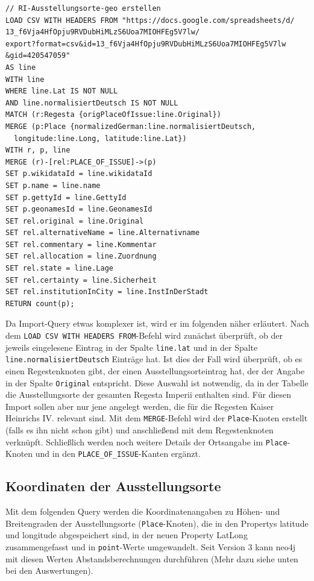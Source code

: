 \documentclass[ngerman,]{scrreprt}
\begin{document}
\begin{verbatim}
// RI-Ausstellungsorte-geo erstellen
LOAD CSV WITH HEADERS FROM "https://docs.google.com/spreadsheets/d/
13_f6Vja4HfOpju9RVDubHiMLzS6Uoa7MIOHFEg5V7lw/
export?format=csv&id=13_f6Vja4HfOpju9RVDubHiMLzS6Uoa7MIOHFEg5V7lw
&gid=420547059"
AS line
WITH line
WHERE line.Lat IS NOT NULL
AND line.normalisiertDeutsch IS NOT NULL
MATCH (r:Regesta {origPlaceOfIssue:line.Original})
MERGE (p:Place {normalizedGerman:line.normalisiertDeutsch,
  longitude:line.Long, latitude:line.Lat})
WITH r, p, line
MERGE (r)-[rel:PLACE_OF_ISSUE]->(p)
SET p.wikidataId = line.wikidataId
SET p.name = line.name
SET p.gettyId = line.GettyId
SET p.geonamesId = line.GeonamesId
SET rel.original = line.Original
SET rel.alternativeName = line.Alternativname
SET rel.commentary = line.Kommentar
SET rel.allocation = line.Zuordnung
SET rel.state = line.Lage
SET rel.certainty = line.Sicherheit
SET rel.institutionInCity = line.InstInDerStadt
RETURN count(p);
\end{verbatim}

Da Import-Query etwas komplexer ist, wird er im folgenden näher erläutert. Nach dem \texttt{LOAD\ CSV\ WITH\ HEADERS\ FROM}-Befehl wird zunächst überprüft, ob der jeweils eingelesene Eintrag in der Spalte \texttt{line.lat} und in der Spalte \texttt{line.normalisiertDeutsch} Einträge hat. Ist dies der Fall wird überprüft, ob es einen Regestenknoten gibt, der einen Ausstellungsorteintrag hat, der der Angabe in der Spalte \texttt{Original} entspricht. Diese Auswahl ist notwendig, da in der Tabelle die Ausstellungsorte der gesamten Regesta Imperii enthalten sind. Für diesen Import sollen aber nur jene angelegt werden, die für die Regesten Kaiser Heinrichs IV. relevant sind. Mit dem \texttt{MERGE}-Befehl wird der \texttt{Place}-Knoten erstellt (falls es ihn nicht schon gibt) und anschließend mit dem Regestenknoten verknüpft. Schließlich werden noch weitere Details der Ortsangabe im \texttt{Place}-Knoten und in den \texttt{PLACE\_OF\_ISSUE}-Kanten ergänzt.

\subsection{Koordinaten der Ausstellungsorte}\label{koordinaten-der-ausstellungsorte}

Mit dem folgenden Query werden die Koordinatenangaben zu Höhen- und Breitengraden der Ausstellungsorte (\texttt{Place}-Knoten), die in den Propertys latitude und longitude abgespeichert sind, in der neuen Property LatLong zusammengefasst und in \texttt{point}-Werte umgewandelt. Seit Version 3 kann neo4j mit diesen Werten Abstandsberechnungen durchführen (Mehr dazu siehe unten bei den Auswertungen).
\end{document}
